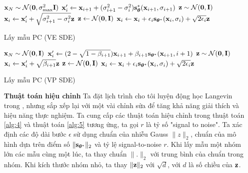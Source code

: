 \documentclass{article} %
\begin{document}
\begin{algorithm}[h!]
    \DontPrintSemicolon
    $\bold{x}_N \sim \mathcal{N}(\bold{0}, \sigma_{\max}^2 \bold{I})$\;
     {
        $\bold{x}_i^{\prime} \gets \bold{x}_{i+1} + (\sigma_{i+1}^2 - \sigma_i^2)\bold{s}_{\boldsymbol{\theta}}^{\ast}(\bold{x}_{i+1}, \sigma_{i+1})$\;
        $\bold{z} \sim \mathcal{N}(\bold{0}, \bold{I})$\;
        $\bold{x}_i \gets \bold{x}_i^{\prime} + \sqrt{\sigma_{i+1}^2 - \sigma_i^2} \bold{z}$\;
         {
            $\bold{z} \gets \mathcal{N}(\bold{0}, \bold{I})$\;
            $\bold{x}_i \gets \bold{x}_i + \epsilon_i \bold{s}_{\boldsymbol{\theta}^{\ast}}(\bold{x}_i, \sigma_i) + \sqrt{2 \epsilon_i} \bold{z}$\;
        }
    }
    \;
    \caption{Lấy mẫu PC (VE SDE)}
    \label{alg:2}
\end{algorithm}

\begin{algorithm}[h!]
    \DontPrintSemicolon
    $\bold{x}_N \sim \mathcal{N}(\bold{0}, \bold{I})$\;
     {
        $\bold{x}_i^{\prime} \gets (2 - \sqrt{1 - \beta_{i+1}}) \bold{x}_{i+1} + \beta_{i+1} \bold{s}_{\boldsymbol{\theta}^{\ast}}(\bold{x}_{i+1}, i+1)$\;
        $\bold{z} \sim \mathcal{N}(\bold{0}, \bold{I})$\;
        $\bold{x}_i \gets \bold{x}_i^{\prime} + \sqrt{\beta_{i+1}} \bold{z}$\;
         {
            $\bold{z} \gets \mathcal{N}(\bold{0}, \bold{I})$\;
            $\bold{x}_i \gets \bold{x}_i + \epsilon_i \bold{s}_{\boldsymbol{\theta}^{\ast}}(\bold{x}_i, \sigma_i) + \sqrt{2 \epsilon_i} \bold{z}$\;
        }
    }
    \;
    \caption{Lấy mẫu PC (VP SDE)}
    \label{alg:3}
\end{algorithm}

\textbf{Thuật toán hiệu chỉnh} Ta đặt lịch trình cho tôi luyện động học Langevin trong \citep{song2019generative}, nhưng sắp xếp lại với một vài chỉnh sửa để tăng khả năng giải thích và hiệu năng thực nghiệm.
Ta cung cấp các thuật toán hiệu chỉnh trong thuật toán \ref{alg:4} và thuật toán \ref{alg:5} tương ứng, ta gọi $r$ là tỷ số "signal to noise".
Ta xác định các độ dài bước $\epsilon$ sử dụng chuẩn của nhiễu Gauss $\lVert z \rVert_2$, chuẩn của mô hình dựa trên điểm số $\lVert \bold{s}_{\boldsymbol{\theta}^{\ast}} \rVert_2$ và tỷ lệ signal-to-noise $r$.
Khi lấy mẫu một nhóm lớn các mẫu cùng một lúc, ta thay chuẩn $\lVert . \rVert_2$ với trung bình của chuẩn trong nhóm.
Khi kích thước nhóm nhỏ, ta thay $\lVert \bold{z} \rVert_2$ với $\sqrt{d}$, với $d$ là số chiều của $\bold{z}$.
\end{document}
